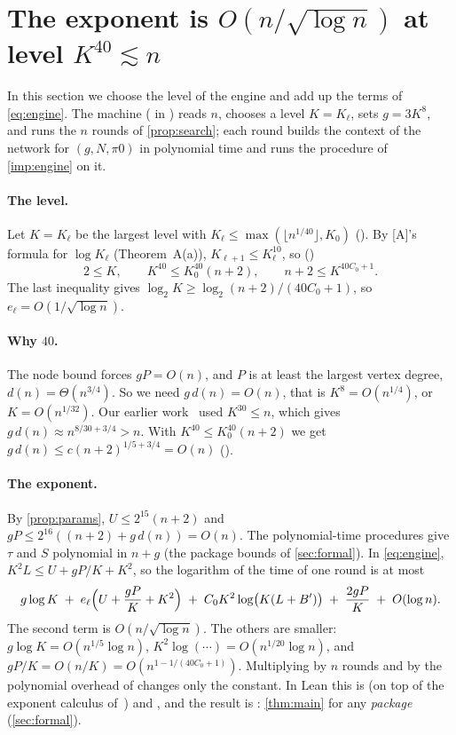 \documentclass[10pt]{amsart}
\theoremstyle{plain}
\theoremstyle{definition}
\theoremstyle{remark}
\numberwithin{equation}{section}
\newcommand{\A}{\textup{[A]}}
\begin{document}
\section{\texorpdfstring{The exponent is $O(n/\sqrt{\log n})$ at level $K^{40}\lesssim n$}{The exponent at level K to the 40 at most n}}\label{sec:rate}

In this section we choose the level of the engine and add up the terms of \eqref{eq:engine}. The machine ( in ) reads $n$, chooses a level $K=K_\ell$, sets $g=3K^8$, and
runs the $n$ rounds of \cref{prop:search}; each round builds the context of the network for
$(g,N,\pi0)$ in polynomial time and runs the procedure of \cref{imp:engine} on it.

\paragraph{The level.} Let $K=K_\ell$ be the largest level with $K_\ell\le\max(\lfloor n^{1/40}\rfloor,K_0)$
(). By \A's formula for $\log K_\ell$ (Theorem~A(a)), $K_{\ell+1}\le K_\ell^{10}$, so
()
\begin{equation}\label{eq:level}
  2\le K,\qquad K^{40}\le K_0^{40}(n+2),\qquad n+2\le K^{40C_0+1}.
\end{equation}
The last inequality gives $\log_2K\ge\log_2(n+2)/(40C_0+1)$, so $e_\ell=O(1/\sqrt{\log n})$.

\paragraph{Why $40$.} The node bound forces $gP=O(n)$, and $P$ is at least the largest vertex degree,
$d(n)=\Theta(n^{3/4})$. So we need $g\,d(n)=O(n)$, that is $K^8=O(n^{1/4})$, or $K=O(n^{1/32})$. Our
earlier work~\cite{Tulsyan26} used $K^{30}\le n$, which gives $g\,d(n)\approx n^{8/30+3/4}>n$. With
$K^{40}\le K_0^{40}(n+2)$ we get $g\,d(n)\le c(n+2)^{1/5+3/4}=O(n)$ ().

\paragraph{The exponent.} By \cref{prop:params}, $U\le2^{15}(n+2)$ and $gP\le2^{16}((n+2)+g\,d(n))=O(n)$.
The polynomial-time procedures give $\tau$ and $S$ polynomial in $n+g$ (the package bounds of
\cref{sec:formal}). In \eqref{eq:engine}, $K^2L\le U+gP/K+K^2$, so the logarithm of the time of one round is at
most
\[
  g\log K\;+\;e_\ell\Bigl(U+\frac{gP}{K}+K^2\Bigr)\;+\;C_0K^2\log\bigl(K(L+B')\bigr)\;+\;\frac{2gP}{K}\;+\;O(\log n).
\]
The second term is $O(n/\sqrt{\log n})$. The others are smaller: $g\log K=O(n^{1/5}\log n)$,
$K^2\log(\cdots)=O(n^{1/20}\log n)$, and $gP/K=O(n/K)=O(n^{1-1/(40C_0+1)})$. Multiplying by $n$ rounds
and by the polynomial overhead of  changes only the constant. In Lean
this is  (on top of the exponent calculus  of~\cite{Tulsyan26})
and , and the result is :
\cref{thm:main} for any \emph{package} (\cref{sec:formal}).
\end{document}
